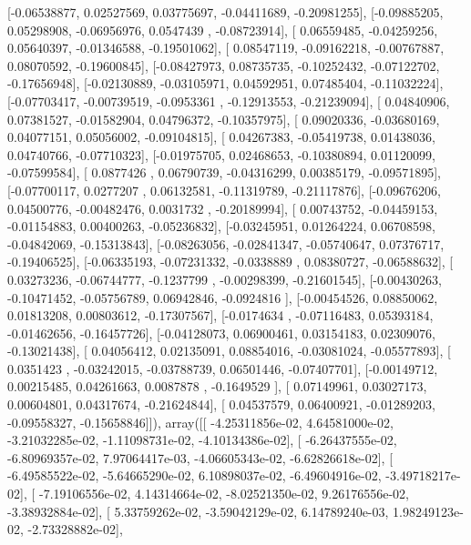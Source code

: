 \documentclass{article}
\begin{document}
       [-0.06538877,  0.02527569,  0.03775697, -0.04411689, -0.20981255],
       [-0.09885205,  0.05298908, -0.06956976,  0.0547439 , -0.08723914],
       [ 0.06559485, -0.04259256,  0.05640397, -0.01346588, -0.19501062],
       [ 0.08547119, -0.09162218, -0.00767887,  0.08070592, -0.19600845],
       [-0.08427973,  0.08735735, -0.10252432, -0.07122702, -0.17656948],
       [-0.02130889, -0.03105971,  0.04592951,  0.07485404, -0.11032224],
       [-0.07703417, -0.00739519, -0.0953361 , -0.12913553, -0.21239094],
       [ 0.04840906,  0.07381527, -0.01582904,  0.04796372, -0.10357975],
       [ 0.09020336, -0.03680169,  0.04077151,  0.05056002, -0.09104815],
       [ 0.04267383, -0.05419738,  0.01438036,  0.04740766, -0.07710323],
       [-0.01975705,  0.02468653, -0.10380894,  0.01120099, -0.07599584],
       [ 0.0877426 ,  0.06790739, -0.04316299,  0.00385179, -0.09571895],
       [-0.07700117,  0.0277207 ,  0.06132581, -0.11319789, -0.21117876],
       [-0.09676206,  0.04500776, -0.00482476,  0.0031732 , -0.20189994],
       [ 0.00743752, -0.04459153, -0.01154883,  0.00400263, -0.05236832],
       [-0.03245951,  0.01264224,  0.06708598, -0.04842069, -0.15313843],
       [-0.08263056, -0.02841347, -0.05740647,  0.07376717, -0.19406525],
       [-0.06335193, -0.07231332, -0.0338889 ,  0.08380727, -0.06588632],
       [ 0.03273236, -0.06744777, -0.1237799 , -0.00298399, -0.21601545],
       [-0.00430263, -0.10471452, -0.05756789,  0.06942846, -0.0924816 ],
       [-0.00454526,  0.08850062,  0.01813208,  0.00803612, -0.17307567],
       [-0.0174634 , -0.07116483,  0.05393184, -0.01462656, -0.16457726],
       [-0.04128073,  0.06900461,  0.03154183,  0.02309076, -0.13021438],
       [ 0.04056412,  0.02135091,  0.08854016, -0.03081024, -0.05577893],
       [ 0.0351423 , -0.03242015, -0.03788739,  0.06501446, -0.07407701],
       [-0.00149712,  0.00215485,  0.04261663,  0.0087878 , -0.1649529 ],
       [ 0.07149961,  0.03027173,  0.00604801,  0.04317674, -0.21624844],
       [ 0.04537579,  0.06400921, -0.01289203, -0.09558327, -0.15658846]]), array([[ -4.25311856e-02,   4.64581000e-02,  -3.21032285e-02,
         -1.11098731e-02,  -4.10134386e-02],
       [ -6.26437555e-02,  -6.80969357e-02,   7.97064417e-03,
         -4.06605343e-02,  -6.62826618e-02],
       [ -6.49585522e-02,  -5.64665290e-02,   6.10898037e-02,
         -6.49604916e-02,  -3.49718217e-02],
       [ -7.19106556e-02,   4.14314664e-02,  -8.02521350e-02,
          9.26176556e-02,  -3.38932884e-02],
       [  5.33759262e-02,  -3.59042129e-02,   6.14789240e-03,
          1.98249123e-02,  -2.73328882e-02],
\end{document}
